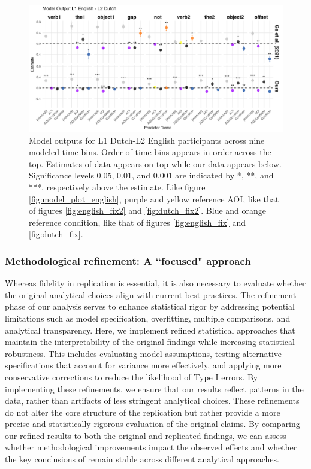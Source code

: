\begin{figure}[H]  %
    \centering
    \includegraphics[width=\textwidth,height=\textheight,keepaspectratio]{viz/model_plot_dutch.png}
    \caption{Model outputs for L1 Dutch-L2 English participants across nine modeled time bins. Order of time bins appears in order across the top. Estimates of \cite{Ge2021} data appears on top while our data appears below. Significance levels 0.05, 0.01, and 0.001 are indicated by *, **, and ***, respectively above the estimate. Like figure \ref{fig:model_plot_english}, purple and yellow reference AOI, like that of figures \ref{fig:english_fix2} and \ref{fig:dutch_fix2}. Blue and orange reference condition, like that of figures \ref{fig:english_fix} and \ref{fig:dutch_fix}.}
    \label{fig:model_plot_dutch}
\end{figure}





\subsubsection{Methodological refinement: A ``focused" approach}

Whereas fidelity in replication is essential, it is also necessary to evaluate whether the original analytical choices align with current best practices. The refinement phase of our analysis serves to enhance statistical rigor by addressing potential limitations such as model specification, overfitting, multiple comparisons, and analytical transparency. Here, we implement refined statistical approaches that maintain the interpretability of the original findings while increasing statistical robustness. This includes evaluating model assumptions, testing alternative specifications that account for variance more effectively, and applying more conservative corrections to reduce the likelihood of Type I errors. By implementing these refinements, we ensure that our results reflect patterns in the data, rather than artifacts of less stringent analytical choices. These refinements do not alter the core structure of the replication but rather provide a more precise and statistically rigorous evaluation of the original claims. By comparing our refined results to both the original and replicated findings, we can assess whether methodological improvements impact the observed effects and whether the key conclusions of \cite{Ge2021} remain stable across different analytical approaches.

